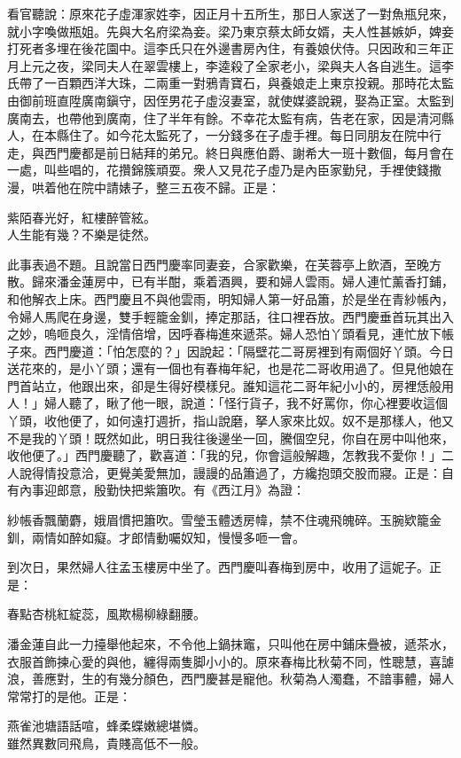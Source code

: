 看官聽說：原來花子虛渾家姓李，因正月十五所生，那日人家送了一對魚瓶兒來，就小字喚做瓶姐。先與大名府梁為妾。梁乃東京蔡太師女婿，夫人性甚嫉妒，婢妾打死者多埋在後花園中。這李氏只在外邊書房內住，有養娘伏侍。只因政和三年正月上元之夜，梁同夫人在翠雲樓上，李逵殺了全家老小，{}梁與夫人各自逃生。這李氏帶了一百顆西洋大珠，{}二兩重一對鴉青寶石，與養娘走上東京投親。那時花太監由御前班直陞廣南鎭守，因侄男花子虛沒妻室，就使媒婆說親，娶為正室。太監到廣南去，也帶他到廣南，住了半年有餘。不幸花太監有病，告老在家，因是清河縣人，在本縣住了。如今花太監死了，一分錢多在子虛手裡。每日同朋友在院中行走，與西門慶都是前日結拜的弟兄。終日與應伯爵、謝希大一班十數個，每月會在一處，叫些唱的，花攢錦簇頑耍。衆人又見花子虛乃是內臣家勤兒，手裡使錢撒漫，哄着他在院中請婊子，整三五夜不歸。正是：

\begin{myquote}
紫陌春光好，紅樓醉管絃。\\人生能有幾？不樂是徒然。
\end{myquote}

此事表過不題。且說當日西門慶率同妻妾，合家歡樂，在芙蓉亭上飲酒，至晚方散。歸來潘金蓮房中，已有半酣，乘着酒興，要和婦人雲雨。婦人連忙薰香打鋪，和他解衣上床。西門慶且不與他雲雨，明知婦人第一好品簫，於是坐在青紗帳內，令婦人馬爬在身邊，雙手輕籠金釧，捧定那話，往口裡吞放。西門慶垂首玩其出入之妙，嗚咂良久，淫情倍增，因呼春梅進來遞茶。{}婦人恐怕丫頭看見，連忙放下帳子來。西門慶道：「怕怎麼的？」因說起：「隔壁花二哥房裡到有兩個好丫頭。今日送花來的，是小丫頭；還有一個也有春梅年紀，也是花二哥收用過了。但見他娘在門首站立，{}他跟出來，卻是生得好模樣兒。誰知這花二哥年紀小小的，房裡恁般用人！」{}婦人聽了，瞅了他一眼，說道：「怪行貨子，我不好罵你，你心裡要收這個丫頭，{}收他便了，如何遠打週折，指山說磨，拏人家來比奴。奴不是那樣人，他又不是我的丫頭！既然如此，明日我往後邊坐一回，騰個空兒，你自在房中叫他來，收他便了。」{}西門慶聽了，歡喜道：「我的兒，你會這般解趣，怎教我不愛你！」二人說得情投意洽，更覺美愛無加，謾謾的品簫過了，方纔抱頭交股而寢。正是：自有內事迎郎意，殷勤快把紫簫吹。有《西江月》為證：

\begin{myquote}
紗帳香飄蘭麝，娥眉慣把簫吹。雪瑩玉體透房幃，禁不住魂飛魄碎。玉腕欵籠金釧，兩情如醉如癡。才郎情動囑奴知，慢慢多咂一會。
\end{myquote}

到次日，果然婦人往孟玉樓房中坐了。西門慶叫春梅到房中，收用了這妮子。正是：

\begin{myquote}
春點杏桃紅綻蕊，風欺楊柳綠翻腰。
\end{myquote}

潘金蓮自此一力擡舉他起來，不令他上鍋抹竈，只叫他在房中鋪床疊被，遞茶水，衣服首飾揀心愛的與他，纏得兩隻脚小小的。原來春梅比秋菊不同，性聰慧，喜謔浪，善應對，生的有幾分顏色，西門慶甚是寵他。秋菊為人濁蠢，不諳事體，婦人常常打的是他。正是：

\begin{myquote}
燕雀池塘語話喧，蜂柔蝶嫩總堪憐。\\雖然異數同飛鳥，貴賤高低不一般。
\end{myquote}

